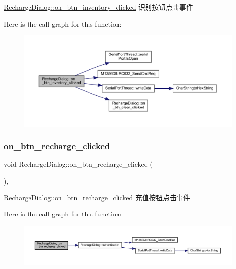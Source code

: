 \mbox{\hyperlink{class_recharge_dialog_aafd9329cbf935615b90bb79350681f8b}{Recharge\+Dialog\+::on\+\_\+btn\+\_\+inventory\+\_\+clicked}} 识别按钮点击事件 

Here is the call graph for this function\+:
\nopagebreak
\begin{figure}[H]
\begin{center}
\leavevmode
\includegraphics[width=350pt]{class_recharge_dialog_aafd9329cbf935615b90bb79350681f8b_cgraph}
\end{center}
\end{figure}
\mbox{\label{class_recharge_dialog_a39b9307ae35c1c2e7e95d255eb2fdc73}} 
\subsubsection{\texorpdfstring{on\_btn\_recharge\_clicked}{on\_btn\_recharge\_clicked}}
{\footnotesize\ttfamily void Recharge\+Dialog\+::on\+\_\+btn\+\_\+recharge\+\_\+clicked (\begin{DoxyParamCaption}{ }\end{DoxyParamCaption})\hspace{0.3cm}{\ttfamily [private]}, {\ttfamily [slot]}}



\mbox{\hyperlink{class_recharge_dialog_a39b9307ae35c1c2e7e95d255eb2fdc73}{Recharge\+Dialog\+::on\+\_\+btn\+\_\+recharge\+\_\+clicked}} 充值按钮点击事件 

Here is the call graph for this function\+:
\nopagebreak
\begin{figure}[H]
\begin{center}
\leavevmode
\includegraphics[width=350pt]{class_recharge_dialog_a39b9307ae35c1c2e7e95d255eb2fdc73_cgraph}
\end{center}
\end{figure}
\mbox{\label{class_recharge_dialog_acead4cd4509b27f98895adc69b77c9fd}} 
